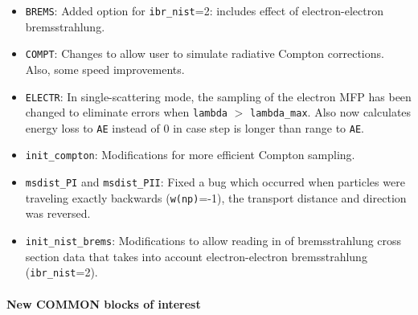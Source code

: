 \begin{itemize}

\item
{}
{\tt BREMS}: Added option for {\tt ibr\_nist}=2: includes effect of
electron-electron bremsstrahlung.

\item
{}
{\tt COMPT}: Changes to allow user to simulate radiative Compton corrections.
Also, some speed improvements.

\item
{}
{\tt ELECTR}: In single-scattering mode, the sampling of the electron
MFP has been changed to eliminate errors when {\tt lambda} $>$ {\tt lambda\_max}.  Also now calculates energy loss to {\tt AE} instead of 0 in case step
is longer than range to {\tt AE}.

\item
{}
{\tt init\_compton}: Modifications for more efficient Compton sampling.

\item
{}
{\tt msdist\_PI} and {\tt msdist\_PII}: Fixed a bug which occurred
when particles were traveling exactly backwards ({\tt w(np)}=-1), the
transport distance and direction was reversed.

\item 
{}
{\tt init\_nist\_brems}: Modifications to allow reading in of
bremsstrahlung cross section data that takes into account electron-electron
bremsstrahlung ({\tt ibr\_nist}=2).

\end{itemize} 
 

\paragraph{New COMMON blocks of interest}


